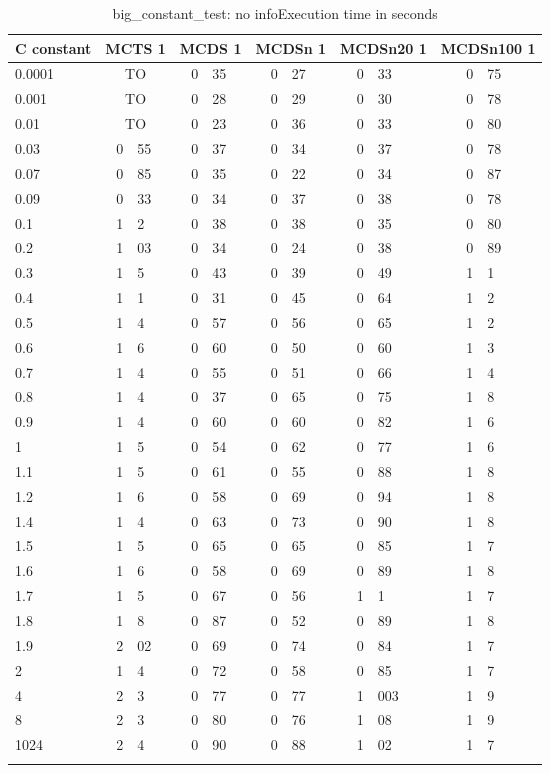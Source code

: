 \begin{table}
    \caption{big_constant_test: no infoExecution time in seconds}
    \begin{tabular}{l*5{r@{.}l}} 
        \toprule
        C constant & \multicolumn{2}{c}{MCTS 1}&\multicolumn{2}{c}{MCDS 1}&\multicolumn{2}{c}{MCDSn 1}&\multicolumn{2}{c}{MCDSn20 1}&\multicolumn{2}{c}{MCDSn100 1}\\
        \midrule
        0.0001 & \multicolumn{2}{c}{TO} & 0&35 & 0&27 & 0&33 & 0&75\\
        0.001 & \multicolumn{2}{c}{TO} & 0&28 & 0&29 & 0&30 & 0&78\\
        0.01 & \multicolumn{2}{c}{TO} & 0&23 & 0&36 & 0&33 & 0&80\\
        0.03 & 0&55 & 0&37 & 0&34 & 0&37 & 0&78\\
        0.07 & 0&85 & 0&35 & 0&22 & 0&34 & 0&87\\
        0.09 & 0&33 & 0&34 & 0&37 & 0&38 & 0&78\\
        0.1 & 1&2 & 0&38 & 0&38 & 0&35 & 0&80\\
        0.2 & 1&03 & 0&34 & 0&24 & 0&38 & 0&89\\
        0.3 & 1&5 & 0&43 & 0&39 & 0&49 & 1&1\\
        0.4 & 1&1 & 0&31 & 0&45 & 0&64 & 1&2\\
        0.5 & 1&4 & 0&57 & 0&56 & 0&65 & 1&2\\
        0.6 & 1&6 & 0&60 & 0&50 & 0&60 & 1&3\\
        0.7 & 1&4 & 0&55 & 0&51 & 0&66 & 1&4\\
        0.8 & 1&4 & 0&37 & 0&65 & 0&75 & 1&8\\
        0.9 & 1&4 & 0&60 & 0&60 & 0&82 & 1&6\\
        1 & 1&5 & 0&54 & 0&62 & 0&77 & 1&6\\
        1.1 & 1&5 & 0&61 & 0&55 & 0&88 & 1&8\\
        1.2 & 1&6 & 0&58 & 0&69 & 0&94 & 1&8\\
        1.4 & 1&4 & 0&63 & 0&73 & 0&90 & 1&8\\
        1.5 & 1&5 & 0&65 & 0&65 & 0&85 & 1&7\\
        1.6 & 1&6 & 0&58 & 0&69 & 0&89 & 1&8\\
        1.7 & 1&5 & 0&67 & 0&56 & 1&1 & 1&7\\
        1.8 & 1&8 & 0&87 & 0&52 & 0&89 & 1&8\\
        1.9 & 2&02 & 0&69 & 0&74 & 0&84 & 1&7\\
        2 & 1&4 & 0&72 & 0&58 & 0&85 & 1&7\\
        4 & 2&3 & 0&77 & 0&77 & 1&003 & 1&9\\
        8 & 2&3 & 0&80 & 0&76 & 1&08 & 1&9\\
        1024 & 2&4 & 0&90 & 0&88 & 1&02 & 1&7\\
        \bottomrule
    \label{big_constant_test}
    \end{tabular}
\end{table}